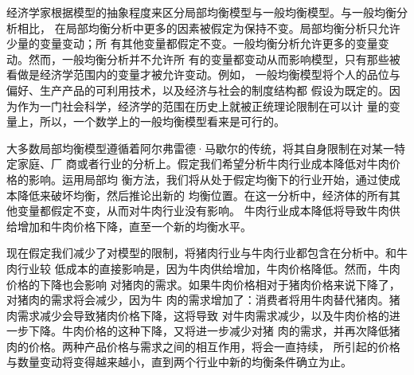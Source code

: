 经济学家根据模型的抽象程度来区分局部均衡模型与一般均衡模型。与一般均衡分析相比，
在局部均衡分析中更多的因素被假定为保持不变。局部均衡分析只允许少量的变量变动；所
有其他变量都假定不变。一般均衡分析允许更多的变量变动。然而，一般均衡分析并不允许所
有的变量都变动从而影响模型，只有那些被看做是经济学范围内的变量才被允许变动。例如，
一般均衡模型将个人的品位与偏好、生产产品的可利用技术，以及经济与社会的制度结构都
假设为既定的。因为作为一门社会科学，经济学的范围在历史上就被正统理论限制在可以计
量的变量上，所以，一个数学上的一般均衡模型看来是可行的。

大多数局部均衡模型遵循着阿尔弗雷德·马歇尔的传统，将其自身限制在对某一特定家庭、厂
商或者行业的分析上。假定我们希望分析牛肉行业成本降低对牛肉价格的影响。运用局部均
衡方法，我们将从处于假定均衡下的行业开始，通过使成本降低来破坏均衡，然后推论出新的
均衡位置。在这一分析中，经济体的所有其他变量都假定不变，从而对牛肉行业没有影响。
牛肉行业成本降低将导致牛肉供给增加和牛肉价格下降，直至一个新的均衡水平。

现在假定我们减少了对模型的限制，将猪肉行业与牛肉行业都包含在分析中。和牛肉行业较
低成本的直接影响是，因为牛肉供给增加，牛肉价格降低。然而，牛肉价格的下降也会影响
对猪肉的需求。如果牛肉价格相对于猪肉价格来说下降了，对猪肉的需求将会减少，因为牛
肉的需求增加了：消费者将用牛肉替代猪肉。猪肉需求减少会导致猪肉价格下降，这将导致
对牛肉需求减少，以及牛肉价格的进一步下降。牛肉价格的这种下降，又将进一步减少对猪
肉的需求，并再次降低猪肉的价格。两种产品价格与需求之间的相互作用，将会一直持续，
所引起的价格与数量变动将变得越来越小，直到两个行业中新的均衡条件确立为止。

